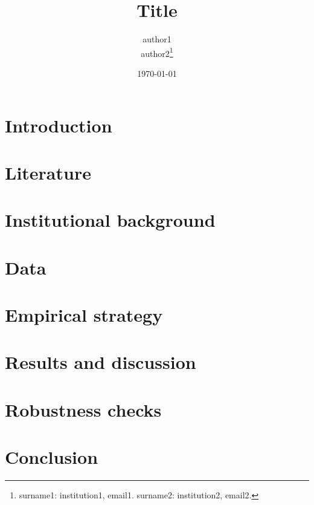 \documentclass[AER, draftmode]{AEA}
\begin{document}
\title{Title}
\author{
    author1\\
    author2\thanks{
surname1: institution1, email1.
surname2: institution2, email2.
}
}

\date{\today}
\pubMonth{}
\pubYear{}
\pubVolume{}
\pubIssue{}
\issueName{}
\JEL{}
\Keywords{}

\begin{abstract}

\end{abstract}

\maketitle

\hypertarget{introduction}{%
\section{Introduction}\label{introduction}}

\hypertarget{literature}{%
\section{Literature}\label{literature}}

\hypertarget{institutional-background}{%
\section{Institutional background}\label{institutional-background}}

\hypertarget{data}{%
\section{Data}\label{data}}

\hypertarget{empirical-strategy}{%
\section{Empirical strategy}\label{empirical-strategy}}

\hypertarget{results-and-discussion}{%
\section{Results and discussion}\label{results-and-discussion}}

\hypertarget{robustness-checks}{%
\section{Robustness checks}\label{robustness-checks}}

\hypertarget{conclusion}{%
\section{Conclusion}\label{conclusion}}

\setlength{\baselineskip}{0pt}
\renewcommand*\MakeUppercase[1]{#1}\printbibliography[heading=bibintoc]

\appendix
\end{document}
